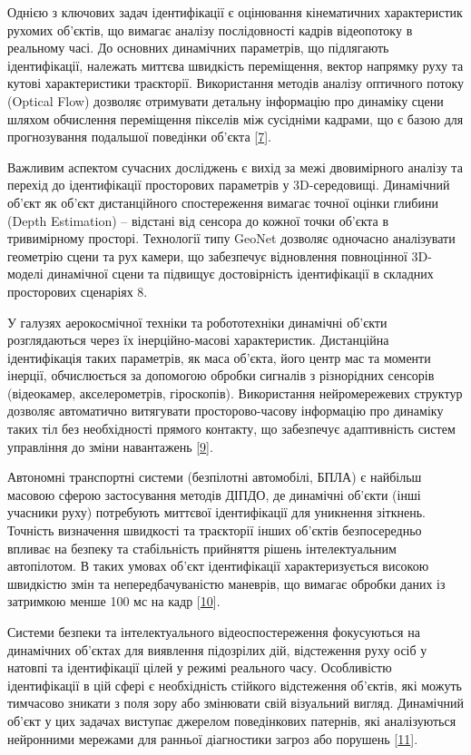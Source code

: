 \documentclass[
]{article}
\begin{document}
Однією з ключових задач ідентифікації є оцінювання кінематичних характеристик рухомих об'єктів, що вимагає аналізу послідовності кадрів відеопотоку в реальному часі. До основних динамічних параметрів, що підлягають ідентифікації, належать миттєва швидкість переміщення, вектор напрямку руху та кутові характеристики траєкторії. Використання методів аналізу оптичного потоку (Optical Flow) дозволяє отримувати детальну інформацію про динаміку сцени шляхом обчислення переміщення пікселів між сусідніми кадрами, що є базою для прогнозування подальшої поведінки об'єкта {[}\hyperref[_Ref221441630]{7}{]}.

Важливим аспектом сучасних досліджень є вихід за межі двовимірного аналізу та перехід до ідентифікації просторових параметрів у 3D-середовищі. Динамічний об'єкт як об'єкт дистанційного спостереження вимагає точної оцінки глибини (Depth Estimation) -- відстані від сенсора до кожної точки об'єкта в тривимірному просторі. Технології типу GeoNet дозволяє одночасно аналізувати геометрію сцени та рух камери, що забезпечує відновлення повноцінної 3D-моделі динамічної сцени та підвищує достовірність ідентифікації в складних просторових сценаріях 8.

У галузях аерокосмічної техніки та робототехніки динамічні об'єкти розглядаються через їх інерційно-масові характеристик. Дистанційна ідентифікація таких параметрів, як маса об'єкта, його центр мас та моменти інерції, обчислюється за допомогою обробки сигналів з різнорідних сенсорів (відеокамер, акселерометрів, гіроскопів). Використання нейромережевих структур дозволяє автоматично витягувати просторово-часову інформацію про динаміку таких тіл без необхідності прямого контакту, що забезпечує адаптивність систем управління до зміни навантажень {[}\hyperref[_Ref221442860]{9}{]}.

Автономні транспортні системи (безпілотні автомобілі, БПЛА) є найбільш масовою сферою застосування методів ДІПДО, де динамічні об'єкти (інші учасники руху) потребують миттєвої ідентифікації для уникнення зіткнень. Точність визначення швидкості та траєкторії інших об'єктів безпосередньо впливає на безпеку та стабільність прийняття рішень інтелектуальним автопілотом. В таких умовах об'єкт ідентифікації характеризується високою швидкістю змін та непередбачуваністю маневрів, що вимагає обробки даних із затримкою менше 100 мс на кадр {[}\hyperref[_Ref221443649]{10}{]}.

Системи безпеки та інтелектуального відеоспостереження фокусуються на динамічних об'єктах для виявлення підозрілих дій, відстеження руху осіб у натовпі та ідентифікації цілей у режимі реального часу. Особливістю ідентифікації в цій сфері є необхідність стійкого відстеження об'єктів, які можуть тимчасово зникати з поля зору або змінювати свій візуальний вигляд. Динамічний об'єкт у цих задачах виступає джерелом поведінкових патернів, які аналізуються нейронними мережами для ранньої діагностики загроз або порушень {[}\hyperref[_Ref221443786]{11}{]}.
\end{document}
